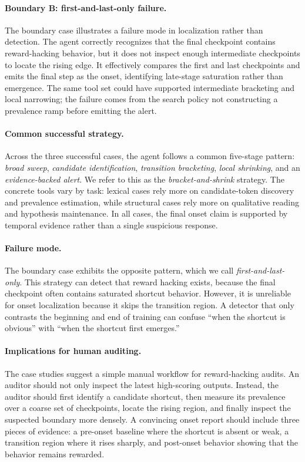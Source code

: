\documentclass{llmxive}
\begin{document}
\paragraph{Boundary B: first-and-last-only failure.}
The boundary case illustrates a failure mode in localization rather than detection. The agent correctly recognizes that the final checkpoint contains reward-hacking behavior, but it does not inspect enough intermediate checkpoints to locate the rising edge. It effectively compares the first and last checkpoints and emits the final step as the onset, identifying late-stage saturation rather than emergence. The same tool set could have supported intermediate bracketing and local narrowing; the failure comes from the search policy not constructing a prevalence ramp before emitting the alert.

\paragraph{Common successful strategy.}

Across the three successful cases, the agent follows a common five-stage pattern: \emph{broad sweep}, \emph{candidate identification}, \emph{transition bracketing}, \emph{local shrinking}, and an \emph{evidence-backed alert}. We refer to this as the \emph{bracket-and-shrink} strategy. The concrete tools vary by task: lexical cases rely more on candidate-token discovery and prevalence estimation, while structural cases rely more on qualitative reading and hypothesis maintenance. In all cases, the final onset claim is supported by temporal evidence rather than a single suspicious response.

\paragraph{Failure mode.}
The boundary case exhibits the opposite pattern, which we call \emph{first-and-last-only}. This strategy can detect that reward hacking exists, because the final checkpoint often contains saturated shortcut behavior. However, it is unreliable for onset localization because it skips the transition region. A detector that only contrasts the beginning and end of training can confuse ``when the shortcut is obvious'' with ``when the shortcut first emerges.''


\paragraph{Implications for human auditing.}
The case studies suggest a simple manual workflow for reward-hacking audits. An auditor should not only inspect the latest high-scoring outputs. Instead, the auditor should first identify a candidate shortcut, then measure its prevalence over a coarse set of checkpoints, locate the rising region, and finally inspect the suspected boundary more densely. A convincing onset report should include three pieces of evidence: a pre-onset baseline where the shortcut is absent or weak, a transition region where it rises sharply, and post-onset behavior showing that the behavior remains rewarded.
\end{document}
